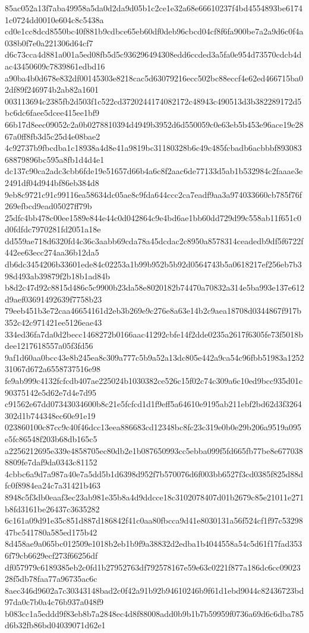 {85ac052a13f7aba49958a5da0d2da9d05b1c2ce1e32a68e66610237f4bd4554893be61741c0724dd0010e604c8c5438a
cd0e1cc8dcd8550bc40f881b9cdbce65eb60df0deb96cbcd04cf8f6fa900be7a2a9d6c0f4a038b0f7e0a221306d64cf7
d6c73cca4d881a001a5ed08fb5d5c936296494308edd6ccded3a5fa0e954d73570cdcb4dac43450609c7839861edbd16
a90ba4b0d678e832df00145303e8218cac5d63079216ecc502bc88eccf4e62ed466715ba02df89f246974b2ab82a1601
003113694c2385fb2d503f1c522cd3720244174082172c48943c490513d3b382289172d5bc6dc6faee5dcee415ee1bf9
66b17d8eec09052c2a0b0278810394d4949b3952d6d550059c0e63eb5b453e96ace19e2867a0ff8fb3d5c25d4e08bae2
4c92737b9fbcdba1c18938a4d8e41a9819bc31180328b6c49c485fcbadb6acbbbf89308368879896bc595a8fb1d4d4e1
dc137c90ca2adc3cbb6fde19e51657d66b4a6c8f2aac6de77133d5ab1b532984c2faaae3e2491df04d944bf86eb384d8
9eb8c9721c91c99116ea58634dc05ae8c9fda644ccc2ca7eadf9aa3a974033660cb785f76f269efbcd9ead05027ff79b
25dfc4bb478c00ee1589e844e44c0d042864c9e4bd6ae1bb60dd729d99c558ab11f651c0d0fdfdc7970281fd2051a18e
dd559ae718d6320fd4c36c3aabb69cda78a45dcdac2c8950a8578314ceadedb9df5f6722f442ee63ecc274aa36b12da5
db6dc3454206b33601ede84c02253a1b99b952b5b92d0564743b5a0618217ef256eb7b398d493ab39879f2b18b1ad84b
b8d2c47d92c8815d486c5c9900b23da58e8020182b74470a70832a314e5ba993e137e612d9aef03691492639f7758b23
79eeb451b3e72caa46654161d2eb3b269e9c276e8a63e14b2c9aea18708d0344867f917b352c42c971421ee5126eae43
334ed36fa7da0d2becc1468272b0166aac41292cbfe14f2dde0235a2617f6305fe73f5018bdee1217618557a05f3fd56
9af1d60aa0bcc43e8b245ea8c309a777c5b9a52a13dc805e442a9ca54c96fbb51983a125231067d672a6558737516e98
fe9ab999c4132fcfcdb407ae225024b1030382ce526c15f02c74c309a6c10ed9bcc935d01c90375142e5d62e7d4e7d95
c91562e67dd07343034600b8c21e5fcfcd1d1f9eff5a64610e9195ab211ebf2bd62d3f3264302d1b744348ec60e91e19
023860100c87cc9c40f46dcc13eea886683cd12348bc8fc23c319e0b0e29b206a9519a095e5fc86548f203b68db165c5
a2256212695e339e4858705ec80db2e1b087650993cc5ebba099f5fd665fb77be8e6770388809fe7daf9da0343c81152
4cbbc6a9d7a987a40e7a5dd5b1d6398d952f7b570076d6f003bb6527f3cd0385f825d88dfc0f8984ea24c7a31421b463
8948c5f3db0eaaf3ec23ab981e35b8a4d9ddcce18c3102078407d01b2679c85e21011e271b8fd3161be26437c3635282
6c161a09d91e35c851d887d186842f41c0aa80fbcca9d41e8030131a56f524cf1f97c5329847bc541780a585ed175b42
8d458ae9a065bc012509e1018b2eb1b9f9a38832d2edba1b4044558a54c5d61f17fad3536f79cb6629ecf273f66256df
df057979c6189385eb2c0fd1b27952763df792578167e59e63c0221f877a186dc6cc0902328f5db78faa77a96735ac6c
8aec346d9602a7c30343148bad2c0f42a91b92b94610246b9f61d1ebd9044c82436723bd97da0c7b0a4c76b937a048f9
b083cc1a5eddd9f83eb8b7a2848ec4d8f88008add0b9b1b7b59959f0736a69d6c6dba785d6b32fb86bd04039071d62e1
}
